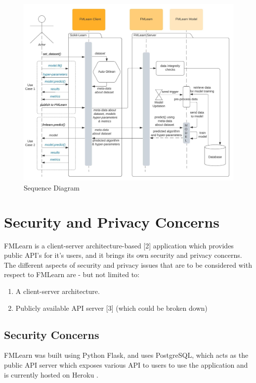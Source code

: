 \begin{figure}[H]
    \centering
    \includegraphics[width=15cm]{images/Sequence Diagram.jpeg}
    \caption{Sequence Diagram}
    \label{sequence-diagram}
\end{figure}


\section{Security and Privacy Concerns}
FMLearn is a client-server architecture-based [2] application which provides public API’s for it's users, and it brings its own security and privacy concerns. The different aspects of security and privacy issues that are to be considered with respect to FMLearn are - but not limited to:

\begin{enumerate}
    \item A client-server architecture.
    \item Publicly available API server [3] (which could be broken down)
\end{enumerate}

\subsection{Security Concerns}

FMLearn was built using Python Flask, and uses PostgreSQL, which acts as the public API server which exposes various API to users to use the application and is currently hosted on Heroku .

